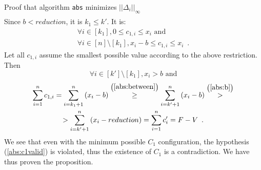 \begin{sepproof}{Proof that algorithm \texttt{abs} minimizes $||\Delta_i||_{\infty}$}
\begin{equation*}
\begin{gathered}
  \end{gathered}
  \end{equation*}
  Since $b < reduction$, it is $k_1 \leq k'$. It is:
  \begin{equation*}
  \begin{gathered}
    \forall i \in \left[k_1\right], 0 \leq c_{1, i} \leq x_i \mbox{ and} \\
    \forall i \in \left[n\right] \setminus \left[k_1\right], x_i - b \leq c_{1, i} \leq x_i \enspace.
  \end{gathered}
  \end{equation*}
  Let all $c_{1, i}$ assume the smallest possible value according to the above restriction. Then
  \begin{equation}
  \label{abs:between}
    \forall i \in \left[k'\right] \setminus \left[k_1\right], x_i > b \mbox{ and}
  \end{equation}
  \begin{equation*}
  \begin{gathered}
    \sum\limits_{i=1}^nc_{1, i} = \sum\limits_{i=k_1+1}^n\left(x_i - b\right) \overset{\left(\ref{abs:between}\right)}{\geq}
    \sum\limits_{i=k'+1}^n\left(x_i - b\right) \overset{\left(\ref{abs:b}\right)}{>} \\
    > \sum\limits_{i=k'+1}^n\left(x_i - reduction\right) = \sum\limits_{i=1}^nc'_i = F - V \enspace.
  \end{gathered}
  \end{equation*}
  We see that even with the minimum possible $C_1$ configuration, the hypothesis (\ref{abs:c1valid}) is violated, thus the
  existence of $C_1$ is a contradiction. We have thus proven the proposition.
\end{sepproof}
